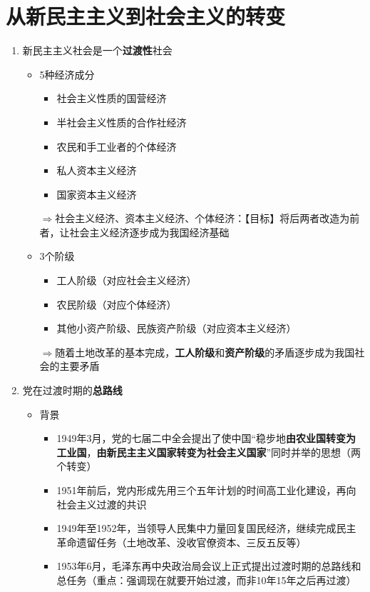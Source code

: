 \documentclass[12pt,openany]{ctexbook}
\begin{document}
\section{从新民主主义到社会主义的转变}
\begin{enumerate}
  \item 新民主主义社会是一个\textbf{过渡性}社会
\begin{itemize}
  \item 5种经济成分
\begin{itemize}
  \item 社会主义性质的国营经济
  \item 半社会主义性质的合作社经济
  \item 农民和手工业者的个体经济
  \item 私人资本主义经济
  \item 国家资本主义经济
\end{itemize}
  \par $\Longrightarrow$社会主义经济、资本主义经济、个体经济：【目标】将后两者改造为前者，让社会主义经济逐步成为我国经济基础
  \item 3个阶级
\begin{itemize}
  \item 工人阶级（对应社会主义经济）
  \item 农民阶级（对应个体经济）
  \item 其他小资产阶级、民族资产阶级（对应资本主义经济）
\end{itemize}
  \par $\Longrightarrow$随着土地改革的基本完成，\textbf{工人阶级}和\textbf{资产阶级}的矛盾逐步成为我国社会的主要矛盾
\end{itemize}
  \item 党在过渡时期的\textbf{总路线}
\begin{itemize}
  \item 背景
\begin{itemize}
  \item 1949年3月，党的七届二中全会提出了使中国“稳步地\textbf{由农业国转变为工业国}，\textbf{由新民主主义国家转变为社会主义国家}”同时并举的思想（两个转变）
  \item 1951年前后，党内形成先用三个五年计划的时间高工业化建设，再向社会主义过渡的共识
  \item 1949年至1952年，当领导人民集中力量回复国民经济，继续完成民主革命遗留任务（土地改革、没收官僚资本、三反五反等）
  \item 1953年6月，毛泽东再中央政治局会议上正式提出过渡时期的总路线和总任务（重点：强调现在就要开始过渡，而非10年15年之后再过渡）

\end{itemize}
\end{itemize}
\end{enumerate}
\end{document}
